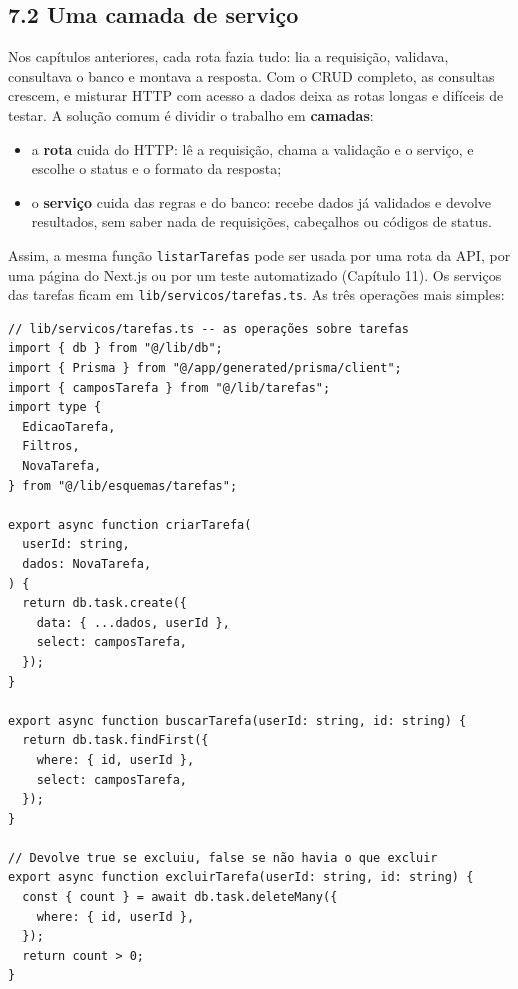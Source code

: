 \subsection{7.2 Uma camada de serviço}

Nos capítulos anteriores, cada rota fazia tudo: lia a requisição, validava, consultava o banco e montava a resposta. Com o CRUD completo, as consultas crescem, e misturar HTTP com acesso a dados deixa as rotas longas e difíceis de testar. A solução comum é dividir o trabalho em \textbf{camadas}:

\begin{itemize}
  \item a \textbf{rota} cuida do HTTP: lê a requisição, chama a validação e o serviço, e escolhe o status e o formato da resposta;
  \item o \textbf{serviço} cuida das regras e do banco: recebe dados já validados e devolve resultados, sem saber nada de requisições, cabeçalhos ou códigos de status.
\end{itemize}

Assim, a mesma função \texttt{listarTarefas} pode ser usada por uma rota da API, por uma página do Next.js ou por um teste automatizado (Capítulo 11). Os serviços das tarefas ficam em \texttt{lib/servicos/tarefas.ts}. As três operações mais simples:

\begin{codigo}
\begin{Verbatim}[breaklines=true, breaksymbolleft={}, fontsize=\footnotesize]
// lib/servicos/tarefas.ts -- as operações sobre tarefas
import { db } from "@/lib/db";
import { Prisma } from "@/app/generated/prisma/client";
import { camposTarefa } from "@/lib/tarefas";
import type {
  EdicaoTarefa,
  Filtros,
  NovaTarefa,
} from "@/lib/esquemas/tarefas";

export async function criarTarefa(
  userId: string,
  dados: NovaTarefa,
) {
  return db.task.create({
    data: { ...dados, userId },
    select: camposTarefa,
  });
}

export async function buscarTarefa(userId: string, id: string) {
  return db.task.findFirst({
    where: { id, userId },
    select: camposTarefa,
  });
}

// Devolve true se excluiu, false se não havia o que excluir
export async function excluirTarefa(userId: string, id: string) {
  const { count } = await db.task.deleteMany({
    where: { id, userId },
  });
  return count > 0;
}
\end{Verbatim}
\end{codigo}

